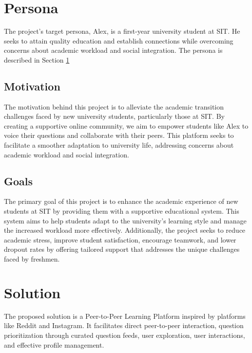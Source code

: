 \section{Persona}\label{persona}
The project's target persona, Alex, is a first-year university student at SIT. He seeks to attain quality education and establish connections while overcoming concerns about academic workload and social integration. The persona is described in Section \ref{persona}

\subsection{Motivation}
The motivation behind this project is to alleviate the academic transition challenges faced by new university students, particularly those at SIT. By creating a supportive online community, we aim to empower students like Alex to voice their questions and collaborate with their peers. This platform seeks to facilitate a smoother adaptation to university life, addressing concerns about academic workload and social integration.

\subsection{Goals}
The primary goal of this project is to enhance the academic experience of new students at SIT by providing them with a supportive educational system. This system aims to help students adapt to the university's learning style and manage the increased workload more effectively. Additionally, the project seeks to reduce academic stress, improve student satisfaction, encourage teamwork, and lower dropout rates by offering tailored support that addresses the unique challenges faced by freshmen.

\section{Solution}\label{solution}
The proposed solution is a Peer-to-Peer Learning Platform inspired by platforms like Reddit and Instagram. It facilitates direct peer-to-peer interaction, question prioritization through curated question feeds, user exploration, user interactions, and effective profile management.




